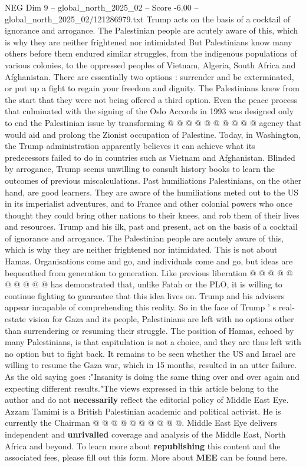 \begin{textsample}{NEG Dim 9 – global\_north\_2025\_02 – Score -6.00 – global\_north\_2025\_02/121286979.txt}
Trump acts on the basis of a cocktail of ignorance and arrogance.
The Palestinian people are acutely aware of this, which is why they are neither frightened nor intimidated But Palestinians know many others before them endured similar struggles, from the indigenous populations of various colonies, to the oppressed peoples of Vietnam, Algeria, South Africa and Afghanistan.
There are essentially two options : surrender and be exterminated, or put up a fight to regain your freedom and dignity.
The Palestinians knew from the start that they were not being offered a third option.
Even the peace process that culminated with the signing of the Oslo Accords in 1993 was designed only to end the Palestinian issue by transforming @ @ @ @ @ @ @ @ @ @ agency that would aid and prolong the Zionist occupation of Palestine.
Today, in Washington, the Trump administration apparently believes it can achieve what its predecessors failed to do in countries such as Vietnam and Afghanistan.
Blinded by arrogance, Trump seems unwilling to consult history books to learn the outcomes of previous miscalculations.
Past humiliations Palestinians, on the other hand, are good learners.
They are aware of the humiliations meted out to the US in its imperialist adventures, and to France and other colonial powers who once thought they could bring other nations to their knees, and rob them of their lives and resources.
Trump and his ilk, past and present, act on the basis of a cocktail of ignorance and arrogance.
The Palestinian people are acutely aware of this, which is why they are neither frightened nor intimidated.
This is not about Hamas.
Organisations come and go, and individuals come and go, but ideas are bequeathed from generation to generation.
Like previous liberation @ @ @ @ @ @ @ @ @ @ has demonstrated that, unlike Fatah or the PLO, it is willing to continue fighting to guarantee that this idea lives on.
Trump and his advisers appear incapable of comprehending this reality.
So in the face of Trump ' s real-estate vision for Gaza and its people, Palestinians are left with no options other than surrendering or resuming their struggle.
The position of Hamas, echoed by many Palestinians, is that capitulation is not a choice, and they are thus left with no option but to fight back.
It remains to be seen whether the US and Israel are willing to resume the Gaza war, which in 15 months, resulted in an utter failure.
As the old saying goes :"Insanity is doing the same thing over and over again and expecting different results."The views expressed in this article belong to the author and do not \textbf{necessarily} reflect the editorial policy of Middle East Eye.
Azzam Tamimi is a British Palestinian academic and political activist.
He is currently the Chairman @ @ @ @ @ @ @ @ @ @.
Middle East Eye delivers independent and \textbf{unrivalled} coverage and analysis of the Middle East, North Africa and beyond.
To learn more about \textbf{republishing} this content and the associated fees, please fill out this form.
More about \textbf{MEE} can be found here.

\end{textsample}
